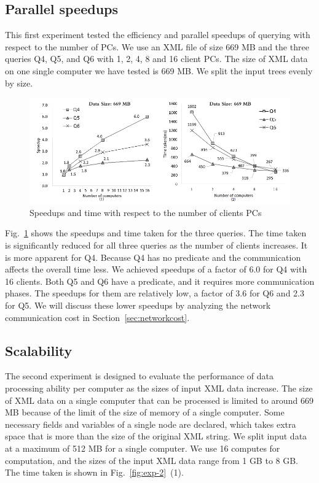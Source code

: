 \subsection{Parallel speedups}
\label{sec:speedup}

This first experiment tested the efficiency and parallel speedups of
querying with respect to the number of PCs. We use an XML file of size
669 MB and the three queries Q4, Q5, and Q6 with 1, 2, 4, 8 and 16
client PCs. 
The size of XML data on one single computer we have tested is 669 MB. 
We split the input trees evenly by size.

\begin{figure}[t]
	\includegraphics[width=.95\linewidth]{partialtree/figures/ex1.png}
	\caption{Speedups and time with respect to the number of clients PCs}
	\label{fig:exp-1}
\end{figure}

Fig.~\ref{fig:exp-1} shows the speedups and time taken for the three queries.
The time taken is significantly reduced for all three queries as the number of 
clients increases.
It is more apparent for Q4. Because Q4 has no predicate and the communication affects
the overall time less. We achieved speedups of a factor of 6.0 for Q4 with 16 clients.
Both Q5 and Q6 have a predicate, and it requires more communication phases. 
The speedups for them are relatively low, a factor of 3.6 for Q6 and 2.3 for Q5.
We will discuss these lower speedups by analyzing the network communication cost in Section~\ref{sec:networkcost}.

\subsection{Scalability}
\label{sec:Scalability}

The second experiment is designed to evaluate the performance of data
processing ability per computer as the sizes of input XML data
increase. The size of XML data on a single computer that can be
processed is limited to around 669 MB because of the limit of the size of memory of a
single computer. Some necessary fields and variables of a single node
are declared, which takes extra space that is more than the size of the original XML
string. We split input data at a maximum of 512 MB for a single computer. 
We use 16 computes for
computation, and the sizes of the input XML data range from 1 GB to
8 GB. The time taken is shown in Fig.~\ref{fig:exp-2}~(1).

